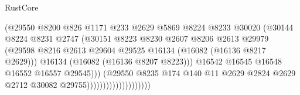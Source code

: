 \begin{lexlean}{RustCore}
\begin{coremodule}
                                            (@29550
                                              @8200
                                              @826
                                              @1171
                                              @233
                                              @2629
                                              @5869
                                              @8224
                                              @8233
                                              @30020
                                              (@30144
                                                @8224
                                                @8231
                                                @2747
                                                (@30151
                                                  @8223
                                                  @8230
                                                  @2607
                                                  @8206
                                                  @2613
                                                  @29979
                                                  (@29598
                                                    @8216
                                                    @2613
                                                    @29604
                                                    @29525
                                                    @16134
                                                    (@16082 (@16136 @8217 @2629)))
                                                  @16134
                                                  (@16082 (@16136 @8207 @8223)))
                                                @16542
                                                @16545
                                                @16548
                                                @16552
                                                @16557
                                                @29545)))
                                          (@29550
                                            @8235
                                            @174
                                            @140
                                            @11
                                            @2629
                                            @2824
                                            @2629
                                            @2712
                                            @30082
                                            @29755))))))))))))))))))))

\end{coremodule}
\end{lexlean}
